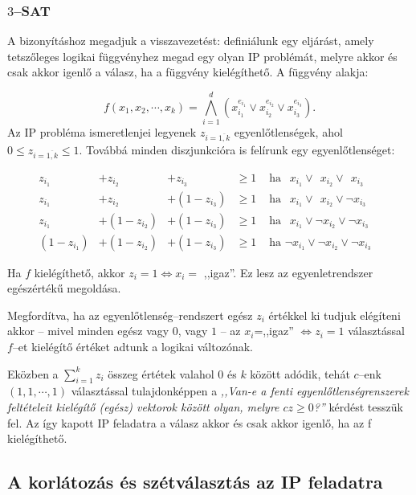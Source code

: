\subsubsection{$3$--SAT}
A bizonyításhoz megadjuk a visszavezetést: definiálunk egy eljárást, amely tetszőleges
logikai függvényhez megad egy olyan IP problémát, melyre akkor és csak akkor igenlő a
válasz, ha a függvény kielégíthető. A függvény alakja:

\[ f(x_1, x_2, \cdots, x_k) = \bigwedge_{i=1}^{d}{\left( x_{i_1}^{e_{i_1}} \vee
		x_{i_2}^{e_{i_2}} \vee x_{i_3}^{e_{i_3}}\right).}
\]
Az IP probléma ismeretlenjei legyenek $z_{i=\overline{1,k}}$ egyenlőtlenségek,
ahol $0 \leq z_{i=\overline{1,k}} \leq 1$. Továbbá minden diszjunkcióra is felírunk egy
egyenlőtlenséget:


\begin{align*}
	z_{i_1}     & + z_{i_2}     & +      z_{i_3}  & \geq 1 & \mbox{ ha }~~x_{i_1} \vee~~x_{i_2}\vee~~x_{i_3}              & \\
	z_{i_1}     & + z_{i_2}     & + (1 - z_{i_3}) & \geq 1 & \mbox{ ha }~~x_{i_1} \vee~~x_{i_2} \vee \neg x_{i_3}         & \\
	z_{i_1}     & + (1-z_{i_2}) & + (1 - z_{i_3}) & \geq 1 & \mbox{ ha }~~x_{i_1} \vee \neg x_{i_2} \vee\neg x_{i_3}      & \\
	(1-z_{i_1}) & + (1-z_{i_2}) & + (1 - z_{i_3}) & \geq 1 & \mbox{ ha } \neg x_{i_1} \vee \neg x_{i_2} \vee \neg x_{i_3} &
\end{align*}

Ha $f$ kielégíthető, akkor $z_i=1 \Leftrightarrow x_i=$ ,,igaz''. Ez lesz az
egyenletrendszer egészértékű megoldása.

Megfordítva, ha az egyenlőtlenség--rendszert egész $z_i$ értékkel ki tudjuk
elégíteni akkor -- mivel minden egész vagy $0$, vagy $1$ -- az $x_i$=,,igaz''
$\Leftrightarrow z_i=1$ választással $f$--et kielégítő értéket adtunk a logikai
változónak.

Eközben a $\sum_{i=1}^{k}{z_i}$ összeg értétek valahol $0$ és $k$ között adódik,
tehát $c$--enk $(1,1,\cdots,1)$ választással tulajdonképpen a \emph{,,Van-e a fenti
	egyenlőtlenségrenszerek feltételeit kielégítő (egész) vektorok között olyan,
	melyre $cz \geq 0$?''} kérdést tesszük fel. Az így kapott IP feladatra a válasz
akkor és csak akkor igenlő, ha az f kielégíthető.

\subsection{A korlátozás és szétválasztás az IP feladatra}

